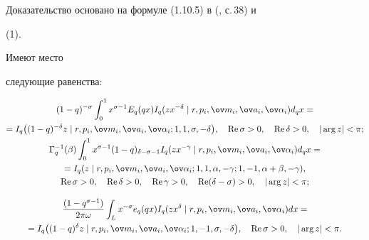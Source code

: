  


Доказательство основано на формуле (1.10.5) в (\cite{18}, с.\,38) и 


(1). 


 


\begin{thm} Имеют место 


следующие равенства$:$ 


\begin{gather*} 


(1-q)^{-\sigma}\int^1_0 x^{\sigma-1}E_q(q x)I_q(z x^{-\delta}\mid 


r, p_i,\ov m_i,\ov a_i,\ov\alpha_i)d_q x=\\ 


% 


= I_q\big((1-q)^{-\delta}z\mid 


r, p_i,\ov m_i,\ov a_i,\ov\alpha_i;1,1,\sigma,-\delta\big),\quad


\re\sigma>0,\quad \re\delta>0,\quad |\arg z|<\pi; \\


%


\Gamma^{-1}_q(\beta)\int^1_0 x^{\sigma-1}(1-q)_{\delta-\sigma-1} 


I_q(z x^{-\gamma}\mid r, p_i,\ov m_i,\ov a_i,\ov\alpha_i)d_q x=\\ 


% 


=I_q(z\mid r, p_i,\ov m_i,\ov a_i,\ov\alpha_i; 


1,1,\alpha,-\gamma;1,-1,\alpha+\beta,-\gamma),\\ 


% 


\re\sigma>0,\quad \re\delta>0,\quad 


\re\gamma>0,\quad\re(\delta-\sigma)>0,\quad 


|\arg z|<\pi; \\[3mm]


%


\frac{(1-q^{\sigma-1})}{2\pi\omega}\int_L 


x^{-\sigma}e_q(q x)I_q(z x^\delta\mid 


r, p_i,\ov m_i,\ov a_i,\ov\alpha_i)dx= \\ 


= I_q\big((1-q)^\delta z\mid 


r, p_i,\ov m_i,\ov a_i,\ov\alpha_i; 


1,-1,\sigma,-\delta\big), \quad


\re\sigma>0,\quad |\arg z|<\pi. 


\end{gather*} 


\end{thm} 


